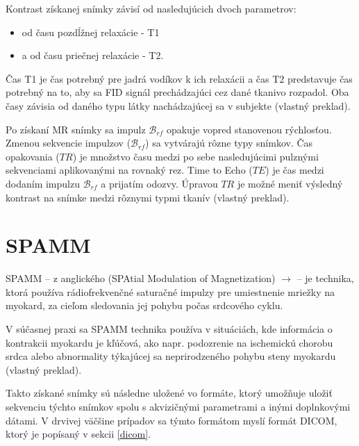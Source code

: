 Kontrast získanej snímky závisí od nasledujúcich dvoch parametrov:

\begin {itemize}
\item {od času pozdĺžnej relaxácie - T1}
\item {a od času priečnej relaxácie - T2.}
\end {itemize}

Čas T1 je čas potrebný pre jadrá vodíkov k ich relaxácii a čas T2 predstavuje čas potrebný na to, aby sa FID signál prechádzajúci cez dané tkanivo rozpadol. Oba časy závisia od daného typu látky nachádzajúcej sa v subjekte \cite{basic_principles_of_mri} (vlastný preklad).

Po získaní MR snímky sa impulz $\mathcal{B}_{rf}$ opakuje vopred stanovenou rýchlosťou. Zmenou sekvencie impulzov ($\mathcal{B}_{rf}$) sa vytvárajú rôzne typy snímkov. Čas opakovania ($TR$) je množstvo času medzi po sebe nasledujúcimi pulznými sekvenciami aplikovanými na rovnaký rez. Time to Echo ($TE$) je čas medzi dodaním impulzu $\mathcal{B}_{rf}$ a prijatím odozvy. Úpravou $TR$ je možné meniť výsledný kontrast na snímke medzi rôznymi typmi tkanív \cite{basic_principles_of_mri} (vlastný preklad). \clearpage

\section {SPAMM}

SPAMM -- z anglického (SPAtial Modulation of Magnetization) $\rightarrow$  -- je technika, ktorá používa rádiofrekvenčné saturačné impulzy pre umiestnenie mriežky na myokard, za cieľom sledovania jej pohybu počas srdcového cyklu.

V súčasnej praxi sa SPAMM technika používa v situáciách, kde informácia o kontrakcii myokardu je kľúčová, ako napr. podozrenie na ischemickú chorobu srdca alebo abnormality týkajúcej sa neprirodzeného pohybu steny myokardu \cite{spamm_description} (vlastný preklad).

Takto získané snímky sú následne uložené vo formáte, ktorý umožňuje uložiť sekvenciu týchto snímkov spolu s akvizičnými parametrami a inými doplnkovými dátami. V drvivej väčšine prípadov sa týmto formátom myslí formát DICOM, ktorý je popísaný v sekcii \ref{dicom}.


